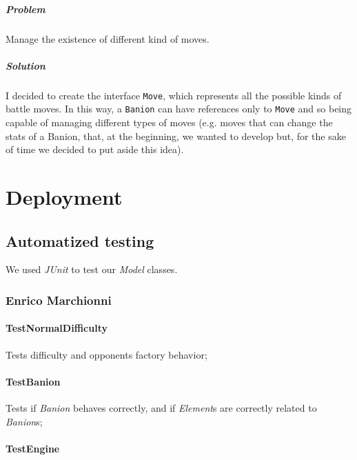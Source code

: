 \documentclass[12pt, a4paper]{report}
\begin{document}
            \paragraph{Problem}

            Manage the existence of different kind of moves.

            \paragraph{Solution}

            I decided to create the interface \verb|Move|, which represents all the possible kinds of battle moves. In this way, a \verb|Banion|
            can have references only to \verb|Move| and so being capable of managing different types of moves (e.g. moves that can
            change the stats of a Banion, that, at the beginning, we wanted to develop but, for the sake of time we decided to put aside this idea).


\chapter{Deployment}

\section{Automatized testing}

    We used \emph{JUnit} to test our \emph{Model} classes.

    \subsection*{Enrico Marchionni}

    \subsubsection{TestNormalDifficulty}
    
    Tests difficulty and opponents factory behavior;

    \subsubsection{TestBanion}
    
    Tests if \emph{Banion} behaves correctly, and if \emph{Element}s are correctly related to \emph{Banion}s;

    \subsubsection{TestEngine}
    
\end{document}
